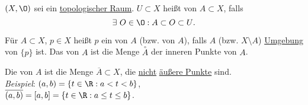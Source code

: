 \begin{definition}[Umgebung]
  \label{def:umgebung}
  $ (X, \O) $ sei ein \hyperref[def:topologie]{topologischer Raum}. $ U \subset X $ heißt  von $ A \subset X $, falls
  \begin{equation*}
    \exists \ O \in \O : A \subset O \subset U\text{.}
  \end{equation*}
\end{definition}

\begin{definition}
  \label{def:innereraeussererpunkt}
  Für $ A \subset X $, $ p \in X $ heißt $ p $ ein  von $ A $ (bzw.  von $ A $), falls $ A $ (bzw. $ X \setminus A $) \hyperref[def:umgebung]{Umgebung} von $ \{ p \} $ ist. Das  von $ A $ ist die Menge $ \overset{\circ}{A} $ der inneren Punkte von $ A $.
\end{definition}

\begin{definition}
  Die  von $ A $ ist die Menge $ \overline{A} \subset X $, die \underline{nicht} \hyperref[def:innereraeussererpunkt]{äußere Punkte} sind. \\
  \emph{Beispiel}: $ (a, b) = \{ t \in \R : a < t < b \} $, \\ $ \overline{(a,b)} = [a,b] = \{ t \in \R : a \leq t \leq b \} $.
\end{definition}

